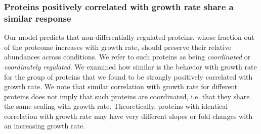 \subsubsection{Proteins positively correlated with growth rate share a similar response}
\label{propchange} 
Our model predicts that non-differentially regulated proteins, whose fraction out of the proteome increases with growth rate, should preserve their relative abundances across conditions.
We refer to such proteins as being \emph{coordinated} or \emph{coordinately regulated}.
We examined how similar is the behavior with growth rate for the group of proteins that we found to be strongly positively correlated with growth rate.
We note that similar correlation with growth rate for different proteins does not imply that such proteins are coordinated, i.e. that they share the same scaling with growth rate.
Theoretically, proteins with identical correlation with growth rate may have very different slopes or fold changes with an increasing growth rate.